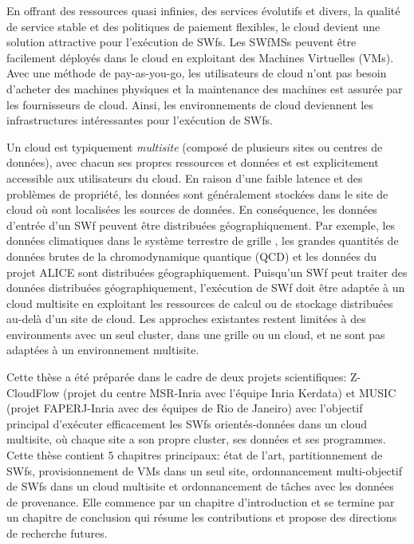 En offrant des ressources quasi infinies, des services évolutifs et divers, la qualité de service stable et des politiques de paiement flexibles, le cloud devient une solution attractive pour l'exécution de SWfs. Les SWfMSs peuvent être facilement déployés dans le cloud en exploitant des Machines Virtuelles (VMs). Avec une méthode de pay-as-you-go, les utilisateurs de cloud n'ont pas besoin d'acheter des machines physiques et la maintenance des machines est assurée par les fournisseurs de cloud. Ainsi, les environnements de cloud deviennent les infrastructures intéressantes pour l'exécution de SWfs. 

Un cloud est typiquement \textit{multisite} (composé de plusieurs sites ou centres de données), avec chacun ses propres ressources et données et est explicitement accessible aux utilisateurs du cloud. En raison d'une faible latence et des problèmes de propriété, les données sont généralement stockées dans le site de cloud où sont localisées les sources de données. En conséquence, les données d'entrée d'un SWf peuvent être distribuées géographiquement. Par exemple, les données climatiques dans le système terrestre de grille \cite{Williams2009}, les grandes quantités de données brutes de la chromodynamique quantique (QCD) \cite{Perry2005} et les données du projet ALICE \cite{alice} sont distribuées géographiquement. Puisqu'un SWf peut traiter des données distribuées géographiquement, l'exécution de SWf doit être adaptée à un cloud multisite en exploitant les ressources de calcul ou de stockage distribuées au-delà d'un site de cloud. Les approches existantes restent limitées à des environments avec un seul cluster, dans une grille ou un cloud, et ne sont pas adaptées à un environnement multisite.

Cette thèse a été préparée dans le cadre de deux projets scientifiques: Z-CloudFlow (projet du centre MSR-Inria avec l'équipe Inria Kerdata) et MUSIC (projet FAPERJ-Inria avec des équipes de Rio de Janeiro) avec l'objectif principal d'exécuter efficacement les SWfs orientés-données dans un cloud multisite, où chaque site a son propre cluster, ses données et ses programmes. Cette thèse contient $5$ chapitres principaux: état de l'art, partitionnement de SWfs, provisionnement de VMs dans un seul site, ordonnancement multi-objectif de SWfs dans un cloud multisite et ordonnancement de tâches avec les données de provenance. Elle commence par un chapitre d'introduction et se termine par un chapitre de conclusion qui résume les contributions et propose des directions de recherche futures.

